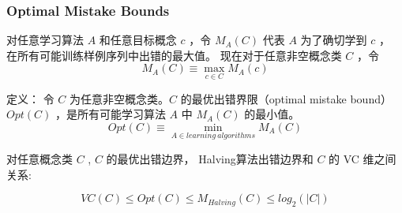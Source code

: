 \documentclass{beamer}
\begin{document}
\begin{frame}
\frametitle{Optimal Mistake Bounds}
\label{sec-5-4}


对任意学习算法 $A$ 和任意目标概念 $c$ ，令 $M_{A}(C)$ 代表 $A$ 为了确切学到 $c$ ， 在所有可能训练样例序列中出错的最大值。
现在对于任意非空概念类 $C$ ，令
$$M_{A}(C) \equiv \max_{c \in C} M_{A}(c)$$

定义： 令 $C$ 为任意非空概念类。$C$ 的最优出错界限（optimal mistake bound） $Opt(C)$ ，是所有可能学习算法 $A$ 中 $M_{A}(C)$ 的最小值。
$$Opt(C) \equiv \min_{A \in learning\  algorithms} M_{A}(C)$$

对任意概念类 $C$ , $C$ 的最优出错边界， Halving算法出错边界和 $C$ 的 VC 维之间关系:

$$VC(C) \leq Opt(C) \leq M_{Halving}(C) \leq log_{2}(|C|)$$
\end{frame}
\end{document}
